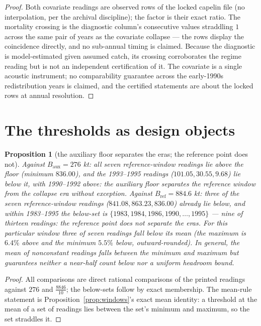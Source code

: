 \documentclass[10pt,twocolumn]{article}
\theoremstyle{plain}
\newtheorem{proposition}[theorem]{Proposition}
\theoremstyle{remark}
\begin{document}
\begin{proof}
Both covariate readings are observed rows of the locked capelin file
(no interpolation, per the archival discipline); the factor is their
exact ratio. The mortality crossing is the diagnostic column's
consecutive values straddling \(1\) across the same pair of years as
the covariate collapse --- the rows display the coincidence directly,
and no sub-annual timing is claimed. Because the diagnostic is
model-estimated given assumed catch, its crossing corroborates the
regime reading but is not an independent certification of it. The
covariate is a single acoustic instrument; no comparability guarantee
across the early-1990s redistribution years is claimed, and the
certified statements are about the locked rows at annual resolution.
\end{proof}

\section{The thresholds as design objects}\label{design}

\begin{proposition}[the auxiliary floor separates the eras; the
reference point does not]\label{prop:discrimination}
Against \(B_{\mathrm{aux}} = 276\) kt: all seven reference-window
readings lie above the floor (minimum \(836.00\)), and the 1993--1995
readings (\(101.05, 30.55, 9.68\)) lie below it, with 1990--1992
above: the auxiliary floor separates the reference window from the
collapse era without exception. Against
\(B_{\mathrm{ref}} = 884.6\) kt: three of the seven reference-window
readings (\(841.08, 863.23, 836.00\)) already lie below, and within
1983--1995 the below-set is \(\{1983, 1984, 1986, 1990, \dots, 1995\}\)
--- nine of thirteen readings: the reference point does not separate
the eras. For this particular window three of seven readings fall below its
mean (the maximum is \(6.4\%\) above and the minimum \(5.5\%\)
below, outward-rounded). In general, the mean of nonconstant readings
falls between the minimum and maximum but guarantees neither a near-half
count below nor a uniform headroom bound.
\end{proposition}

\begin{proof}
All comparisons are direct rational comparisons of the printed
readings against \(276\) and \(\tfrac{8846}{10}\); the below-sets
follow by exact membership. The mean-rule statement is
Proposition~\ref{prop:windows}'s exact mean identity: a threshold at
the mean of a set of readings lies between the set's minimum and
maximum, so the set straddles it.
\end{proof}
\end{document}

